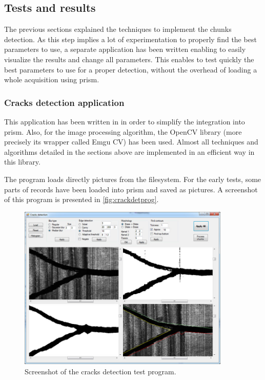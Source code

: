 \subsection{Tests and results}

The previous sections explained the techniques to implement the chunks detection. As this step implies a lot of experimentation to properly find the best parameters to use, a separate application has been written enabling to easily visualize the results and change all parameters. This enables to test quickly the best parameters to use for a proper detection, without the overhead of loading a whole acquisition using \gls{prism}.

\subsubsection{Cracks detection application}

This application has been written in \Csh{} in order to simplify the integration into \gls{prism}. Also, for the image processing algorithm, the OpenCV library (more precisely its \Csh wrapper called Emgu CV) has been used. Almost all techniques and algorithms detailed in the sections above are implemented in an efficient way in this library.

The program loads directly pictures from the filesystem. For the early tests, some parts of records have been loaded into \gls{prism} and saved as pictures. A screenshot of this program is presented in \autoref{fig:crackdetprog}.

\begin{figure}[!ht]
\centering
\includegraphics[width=0.9\textwidth]{images/crack-test-prog}
\caption{Screenshot of the cracks detection test program.}
\label{fig:crackdetprog}
\end{figure}

